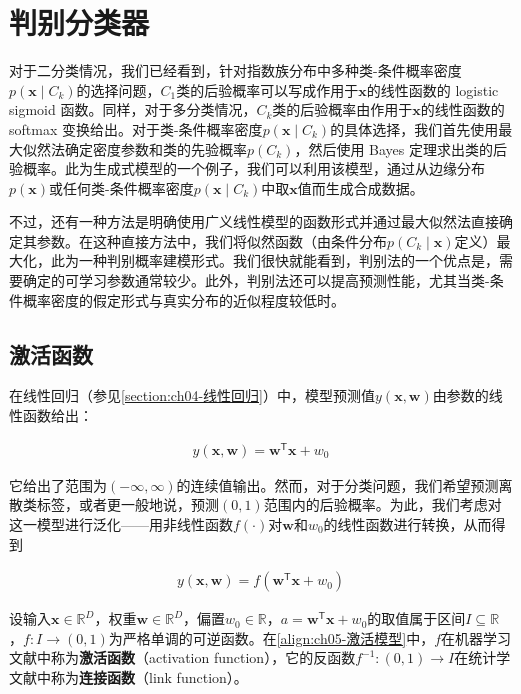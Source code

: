 \documentclass[../../main.tex]{subfiles}
\begin{document}
\section{判别分类器}\label{section:ch05-判别分类器}

对于二分类情况，我们已经看到，针对指数族分布中多种类-条件概率密度$p(\boldsymbol{x}\mid C_k)$的选择问题，$C_1$类的后验概率可以写成作用于$\boldsymbol{x}$的线性函数的 logistic sigmoid 函数。同样，对于多分类情况，$C_k$类的后验概率由作用于$\boldsymbol{x}$的线性函数的 softmax 变换给出。对于类-条件概率密度$p(\boldsymbol{x}\mid C_k)$的具体选择，我们首先使用最大似然法确定密度参数和类的先验概率$p(C_k)$，然后使用 Bayes 定理求出类的后验概率。此为生成式模型的一个例子，我们可以利用该模型，通过从边缘分布$p(\boldsymbol{x})$或任何类-条件概率密度$p(\boldsymbol{x}\mid C_k)$中取$\boldsymbol{x}$值而生成合成数据。

不过，还有一种方法是明确使用广义线性模型的函数形式并通过最大似然法直接确定其参数。在这种直接方法中，我们将似然函数（由条件分布$p(C_k\mid\boldsymbol{x})$定义）最大化，此为一种判别概率建模形式。我们很快就能看到，判别法的一个优点是，需要确定的可学习参数通常较少。此外，判别法还可以提高预测性能，尤其当类-条件概率密度的假定形式与真实分布的近似程度较低时。

\subsection{激活函数}\label{subsection:ch05-激活函数}

在线性回归（参见\cref{section:ch04-线性回归}）中，模型预测值$y(\boldsymbol{x},\boldsymbol{w})$由参数的线性函数给出：

\begin{align}
  y(\boldsymbol{x},\boldsymbol{w})=\boldsymbol{w}^{\mathsf{T}}\boldsymbol{x}+w_0
  \label{align:ch05-线性回归模型}
\end{align}

它给出了范围为$(-\infty,\infty)$的连续值输出。然而，对于分类问题，我们希望预测离散类标签，或者更一般地说，预测$(0,1)$范围内的后验概率。为此，我们考虑对这一模型进行泛化——用非线性函数$f(\cdot)$对$\boldsymbol{w}$和$w_0$的线性函数进行转换，从而得到

\begin{align}
  y(\boldsymbol{x},\boldsymbol{w})=f\left(\boldsymbol{w}^{\mathsf{T}}\boldsymbol{x}+w_0\right)
  \label{align:ch05-激活模型}
\end{align}

\begin{definition}[激活函数与连接函数]\label{definition:ch05-激活函数}
设输入$\boldsymbol{x}\in\mathbb{R}^{D}$，权重$\boldsymbol{w}\in\mathbb{R}^{D}$，偏置$w_0\in\mathbb{R}$，$a=\boldsymbol{w}^{\mathsf{T}}\boldsymbol{x}+w_0$的取值属于区间$I\subseteq\mathbb{R}$，$f:I\to(0,1)$为严格单调的可逆函数。在\eqref{align:ch05-激活模型}中，$f$在机器学习文献中称为\textbf{激活函数}（activation function），它的反函数$f^{-1}:(0,1)\to I$在统计学文献中称为\textbf{连接函数}（link function）。
\end{definition}
\end{document}
